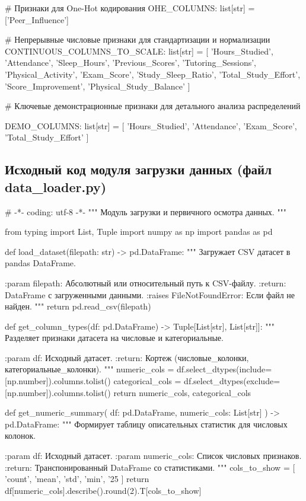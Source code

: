 \documentclass[14pt,a4paper]{extarticle}
\begin{document}
\begin{CodeListing}
# Признаки для One-Hot кодирования
OHE_COLUMNS: list[str] = ['Peer_Influence']

# Непрерывные числовые признаки для стандартизации и нормализации
CONTINUOUS_COLUMNS_TO_SCALE: list[str] = [
    'Hours_Studied', 'Attendance', 'Sleep_Hours', 'Previous_Scores',
    'Tutoring_Sessions', 'Physical_Activity', 'Exam_Score',
    'Study_Sleep_Ratio', 'Total_Study_Effort', 'Score_Improvement',
    'Physical_Study_Balance'
]

# Ключевые демонстрационные признаки для детального анализа распределений

DEMO_COLUMNS: list[str] = [
    'Hours_Studied', 'Attendance', 'Exam_Score', 'Total_Study_Effort'
]\end{CodeListing}

\clearpage
\subsection{Исходный код модуля загрузки данных (файл data\_loader.py)}
\begin{CodeListing}
# -*- coding: utf-8 -*-
"""
Модуль загрузки и первичного осмотра данных.
"""

from typing import List, Tuple
import numpy as np
import pandas as pd


def load_dataset(filepath: str) -> pd.DataFrame:
    """
    Загружает CSV датасет в pandas DataFrame.

    :param filepath: Абсолютный или относительный путь к CSV-файлу.
    :return: DataFrame с загруженными данными.
    :raises FileNotFoundError: Если файл не найден.
    """
    return pd.read_csv(filepath)


def get_column_types(df: pd.DataFrame) -> Tuple[List[str], List[str]]:
    """
    Разделяет признаки датасета на числовые и категориальные.

    :param df: Исходный датасет.
    :return: Кортеж (числовые_колонки, категориальные_колонки).
    """
    numeric_cols = df.select_dtypes(include=[np.number]).columns.tolist()
    categorical_cols = df.select_dtypes(exclude=[np.number]).columns.tolist()
    return numeric_cols, categorical_cols


def get_numeric_summary(
    df: pd.DataFrame, numeric_cols: List[str]
) -> pd.DataFrame:
    """
    Формирует таблицу описательных статистик для числовых колонок.

    :param df: Исходный датасет.
    :param numeric_cols: Список числовых признаков.
    :return: Транспонированный DataFrame со статистиками.
    """
    cols_to_show = [
        'count', 'mean', 'std', 'min', '25%
    ]
    return df[numeric_cols].describe().round(2).T[cols_to_show]\end{CodeListing}
\end{document}
